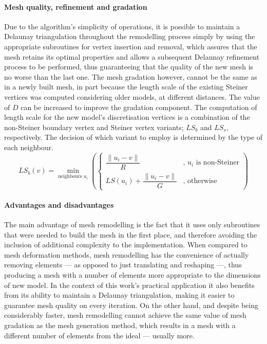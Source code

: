 \paragraph{Mesh quality, refinement and gradation} Due to the algorithm's simplicity of operations, it is possible to maintain a Delaunay triangulation throughout the remodelling process simply by using the appropriate subroutines for vertex insertion and removal, which assures that the mesh retains its optimal properties and allows a subsequent Delaunay refinement process to be performed, thus guaranteeing that the quality of the new mesh is no worse than the last one. The mesh gradation however, cannot be the same as in a newly built mesh, in part because the length scale of the existing Steiner vertices was computed considering older models, at different distances. The value of $D$ can be increased to improve the gradation component. The computation of length scale for the new model's discretisation vertices is a combination of the non-Steiner boundary vertex and Steiner vertex variants; $LS_b$ and $LS_s$, respectively. The decision of which variant to employ is determined by the type of each neighbour.
\begin{equation*}
LS_b(v) = \min_{\text{neighbours }u_i} \left(
\begin{cases}
\dfrac{\|u_i-v\|}{R} & \text{, } u_i \text{ is non-Steiner}\\
LS(u_i) + \dfrac{\|u_i-v\|}{G} & \text{, otherwise}
\end{cases}
\right)
\end{equation*}

\paragraph{Advantages and disadvantages} The main advantage of mesh remodelling is the fact that it uses only subroutines that were needed to build the mesh in the first place, and therefore avoiding the inclusion of additional complexity to the implementation. When compared to mesh deformation methods, mesh remodelling has the convenience of actually removing elements --- as opposed to just translating and reshaping ---, thus producing a mesh with a number of elements more appropriate to the dimensions of new model. In the context of this work's practical application it also benefits from its ability to maintain a Delaunay triangulation, making it easier to guarantee mesh quality on every iteration. On the other hand, and despite being considerably faster, mesh remodelling cannot achieve the same value of mesh gradation as the mesh generation method, which results in a mesh with a different number of elements from the ideal --- usually more.